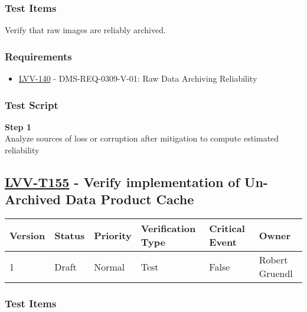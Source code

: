 \subsubsection{Test Items}\label{test-items-22}

Verify that raw images are reliably archived.

\subsubsection{Requirements}\label{requirements-22}

\begin{itemize}
\tightlist
\item
  \href{https://jira.lsstcorp.org/browse/LVV-140}{LVV-140} -
  DMS-REQ-0309-V-01: Raw Data Archiving Reliability
\end{itemize}

\subsubsection{Test Script}\label{test-script-22}

\textbf{Step 1}\\
Analyze sources of loss or corruption after mitigation to compute
estimated reliability\\[2\baselineskip]

\hypertarget{lvv-t155---verify-implementation-of-un-archived-data-product-cache}{\subsection{\texorpdfstring{\href{https://jira.lsstcorp.org/secure/Tests.jspa\#/testCase/LVV-T155}{LVV-T155}
- Verify implementation of Un-Archived Data Product
Cache}{LVV-T155 - Verify implementation of Un-Archived Data Product Cache}}\label{lvv-t155---verify-implementation-of-un-archived-data-product-cache}}

\begin{longtable}[]{@{}llllll@{}}
\toprule
Version & Status & Priority & Verification Type & Critical Event &
Owner\tabularnewline
\midrule
\endhead
1 & Draft & Normal & Test & False & Robert Gruendl\tabularnewline
\bottomrule
\end{longtable}

\subsubsection{Test Items}\label{test-items-23}

